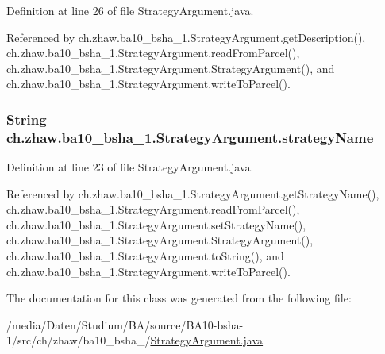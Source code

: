 Definition at line 26 of file StrategyArgument.java.

Referenced by ch.zhaw.ba10\_\-bsha\_\-1.StrategyArgument.getDescription(), ch.zhaw.ba10\_\-bsha\_\-1.StrategyArgument.readFromParcel(), ch.zhaw.ba10\_\-bsha\_\-1.StrategyArgument.StrategyArgument(), and ch.zhaw.ba10\_\-bsha\_\-1.StrategyArgument.writeToParcel().\hypertarget{classch_1_1zhaw_1_1ba10__bsha__1_1_1StrategyArgument_a8253c7846314fd6c03d51eb7dbe12af1}{
\subsubsection[{strategyName}]{\setlength{\rightskip}{0pt plus 5cm}String {\bf ch.zhaw.ba10\_\-bsha\_\-1.StrategyArgument.strategyName}}}
\label{classch_1_1zhaw_1_1ba10__bsha__1_1_1StrategyArgument_a8253c7846314fd6c03d51eb7dbe12af1}


Definition at line 23 of file StrategyArgument.java.

Referenced by ch.zhaw.ba10\_\-bsha\_\-1.StrategyArgument.getStrategyName(), ch.zhaw.ba10\_\-bsha\_\-1.StrategyArgument.readFromParcel(), ch.zhaw.ba10\_\-bsha\_\-1.StrategyArgument.setStrategyName(), ch.zhaw.ba10\_\-bsha\_\-1.StrategyArgument.StrategyArgument(), ch.zhaw.ba10\_\-bsha\_\-1.StrategyArgument.toString(), and ch.zhaw.ba10\_\-bsha\_\-1.StrategyArgument.writeToParcel().

The documentation for this class was generated from the following file:\begin{DoxyCompactItemize}
\item 
/media/Daten/Studium/BA/source/BA10-\/bsha-\/1/src/ch/zhaw/ba10\_\-bsha\_/\hyperlink{StrategyArgument_8java}{StrategyArgument.java}\end{DoxyCompactItemize}
